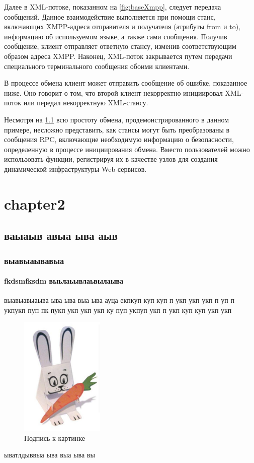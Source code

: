 \documentclass{khaireport}
\begin{document}
Далее в XML-потоке, показанном на \ref{fig:baseXmpp}, следует передача сообщений. Данное взаимодействие выполняется при помощи станс, включающих XMPP-адреса отправителя и получателя (атрибуты from и to), информацию об используемом языке, а также сами сообщения. Получив сообщение, клиент отправляет ответную стансу, изменив соответствующим образом адреса XMPP. Наконец, XML-поток закрывается путем передачи специального терминального сообщения обоими клиентами.

В процессе обмена клиент может отправить сообщение об ошибке, показанное ниже. Оно говорит о том, что второй клиент некорректно инициировал XML-поток или передал некорректную XML-стансу.

Несмотря на \ref{fig:hist} всю простоту обмена, продемонстрированного в данном примере, несложно представить, как стансы могут быть преобразованы в сообщения RPC, включающие необходимую информацию о безопасности, определенную в процессе инициирования обмена. Вместо пользователей можно использовать функции, регистрируя их в качестве узлов для создания динамической инфраструктуры Web-сервисов.

\chapter{chapter2}
\section{ваыаыв авыа ыва аыв}
\subsection{выавыаывавыа}
\subsubsection{fkdsmfksdm выьлаьывлаьвылаыва}
выавыавыаыва ыва ыва выа ыва ауца екпкуп
куп куп п укп укп укп п уп п укпукп
пуп  пк пукп укп укп укп ку пуп укпуп укп
п укп куп куп укп укп
\begin{figure}[!ht]
\centering
\includegraphics[width = 4cm]{images/123.jpeg} 
\caption{Подпись к картинке}
\label{fig:hist}
\end{figure}
ыватлдыввыа ыва выа ыва вы
\end{document}
